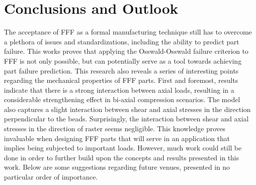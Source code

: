 \documentclass[main.tex]{subfiles}
\begin{document}
\chapter{Conclusions and Outlook} \label{ch:concl}
The acceptance of FFF as a formal manufacturing technique still has to overcome a plethora of issues and standardizations, including the ability to predict part failure. This works proves that applying the Osswald-Osswald failure criterion to FFF is not only possible, but can potentially serve as a tool towards achieving part failure prediction. This research also reveals a series of interesting points regarding the mechanical properties of FFF parts. First and foremost, results indicate that there is a strong interaction between axial loads, resulting in a considerable strengthening effect in bi-axial compression scenarios. The model also captures a slight interaction between shear and axial stresses in the direction perpendicular to the beads. Surprisingly, the interaction between shear and axial stresses in the direction of raster seems negligible. This knowledge proves invaluable when designing FFF parts that will serve in an application that implies being subjected to important loads. However, much work could still be done in order to further build upon the concepts and results presented in this work. Below are some suggestions regarding future venues, presented in no particular order of importance.
\end{document}
